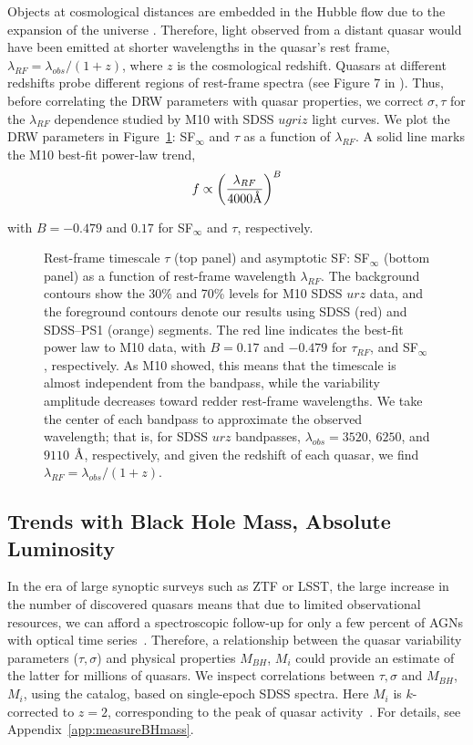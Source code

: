 \documentclass[twocolumn]{aastex62}
\let\oldAA\AA
\renewcommand{\AA}{\text{\normalfont\oldAA}}
\begin{document}
Objects at cosmological distances are embedded in the Hubble flow due to the expansion of the universe \citep{riess2019}. Therefore, light observed from a distant quasar would have been emitted at shorter wavelengths in the quasar's rest frame, $\lambda_{RF} = \lambda_{obs} / (1+z)$, where $z$ is the cosmological redshift. Quasars at different redshifts probe different regions of rest-frame spectra (see Figure 7 in \citealt{shen2019}). Thus, before correlating the DRW parameters with quasar properties, we correct $\sigma, \tau$ for the $\lambda_{RF}$ dependence studied by M10 with SDSS $ugriz$ light curves. We plot the DRW parameters in Figure~\ref{fig:lambda_dependence}: SF$_{\infty}$ and $\tau$ as a function of $\lambda_{RF}$. A solid line marks the M10 best-fit power-law trend,
\begin{equation}
\label{eq:lambda}
f \propto \left( \frac{\lambda_{RF}}{4000 \mbox{\AA}} \right)^{B}
\end{equation}

with  $B=-0.479$ and $0.17$ for SF$_{\infty}$ and $\tau$, respectively.

  
\begin{figure}
	\caption{Rest-frame timescale $\tau$ (top panel) and asymptotic SF: SF$_{\infty}$ (bottom panel) as a function of rest-frame wavelength $\lambda_{RF}$. The background contours show the 30\% and 70\% levels for  M10 SDSS $ urz $  data, and the foreground contours  denote our results using  SDSS (red) and SDSS--PS1 (orange) segments. The red line indicates the best-fit power law to M10 data, with $B=0.17$ and $-0.479$ for $\tau_{RF}$, and SF$_{\infty}$, respectively. As M10 showed, this means that the timescale is almost independent from the bandpass, while the variability amplitude decreases toward redder rest-frame wavelengths.  We take the center of each bandpass to approximate the  observed wavelength; that is, for SDSS $urz$ bandpasses,  $\lambda_{obs} = 3520$, $6250$, and $9110$ $\mbox{\AA}$, respectively, and given the redshift of each quasar, we find $\lambda_{RF}=\lambda_{obs} / (1+z)$.}
	\label{fig:lambda_dependence}
\end{figure} 




\subsection{Trends with Black Hole Mass, Absolute Luminosity}

In the era of large synoptic surveys such as ZTF or LSST, the large increase in the number of discovered quasars means that due to limited observational resources, we can afford a spectroscopic follow-up for only a few percent of AGNs with optical time series~\citep{ivezic2019}. Therefore, a relationship between the quasar variability parameters ($\tau, \sigma$) and physical properties $M_{BH}$, $M_{i}$ could provide an estimate of the latter for millions of quasars. We inspect correlations between $\tau, \sigma$  and $M_{BH}$, $M_{i}$, using the \cite{shen2011} catalog, based on single-epoch SDSS spectra. Here $M_{i}$ is $k$-corrected to  $z=2$, corresponding to the peak of quasar activity~\citep{richards2006a}. For details, see Appendix~\ref{app:measureBHmass}.
\end{document}
